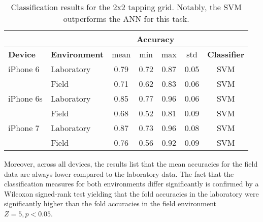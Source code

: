 \begin{table}[h!]
  \centering
  \begin{tabular}{|l|l|c|c|c|c|c|}
    \cline{3-6}
    \multicolumn{2}{c}{} & \multicolumn{4}{|c|}{\textbf{Accuracy}}  \\
    \hline
    \textbf{Device} & \textbf{Environment} & mean &   min &   max  & std &  \textbf{Classifier} \\
    \hline
    iPhone 6 & Laboratory &      0.79 &     0.72 &     0.87 &     0.05 &  SVM \\
    & Field &      0.71 &     0.62 &     0.83 &     0.06 &  SVM \\
    \hline
iPhone 6s     & Laboratory &      0.85 &     0.77 &     0.96 &     0.06 &  SVM \\
& Field &      0.68 &     0.52 &     0.81 &     0.09 &  SVM \\
    \hline
iPhone 7 & Laboratory &      0.87 &     0.73 &     0.96 &     0.08 &  SVM \\
& Field &      0.76 &     0.56 &     0.92 &     0.09 &  SVM \\
    \hline
  \end{tabular}
  \caption{Classification results for the 2x2 tapping grid. Notably, the SVM outperforms the ANN for this task.}
\end{table}



Moreover, across all devices, the results list that the mean accuracies for the field data are always lower compared to the laboratory data. The fact that the classification measures for both environments differ significantly is confirmed by a Wilcoxon signed-rank test yielding that the fold accuracies in the laboratory were significantly higher than the fold accuracies in the field environment $Z = 5, p < 0.05$.

